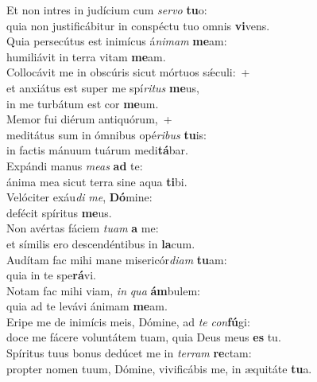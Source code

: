 \evenverse Et non intres in judícium cum \textit{ser}\textit{vo} \textbf{tu}o:~\*\\
\evenverse quia non justificábitur in conspéctu tuo omnis \textbf{vi}vens.\\
\oddverse Quia persecútus est inimícus á\textit{ni}\textit{mam} \textbf{me}am:~\*\\
\oddverse humiliávit in terra vitam \textbf{me}am.\\
\evenverse Collocávit me in obscúris sicut mórtuos sǽculi:~+\\
\evenverse  et anxiátus est super me spí\textit{ri}\textit{tus} \textbf{me}us,~\*\\
\evenverse in me turbátum est cor \textbf{me}um.\\
\oddverse Memor fui diérum antiquórum,~+\\
\oddverse  meditátus sum in ómnibus opé\textit{ri}\textit{bus} \textbf{tu}is:~\*\\
\oddverse in factis mánuum tuárum medi\textbf{tá}bar.\\
\evenverse Expándi manus \textit{me}\textit{as} \textbf{ad} te:~\*\\
\evenverse ánima mea sicut terra sine aqua \textbf{ti}bi.\\
\oddverse Velóciter exáu\textit{di} \textit{me}, \textbf{Dó}mine:~\*\\
\oddverse defécit spíritus \textbf{me}us.\\
\evenverse Non avértas fáciem \textit{tu}\textit{am} \textbf{a} me:~\*\\
\evenverse et símilis ero descendéntibus in \textbf{la}cum.\\
\oddverse Audítam fac mihi mane misericór\textit{di}\textit{am} \textbf{tu}am:~\*\\
\oddverse quia in te spe\textbf{rá}vi.\\
\evenverse Notam fac mihi viam, \textit{in} \textit{qua} \textbf{ám}bulem:~\*\\
\evenverse quia ad te levávi ánimam \textbf{me}am.\\
\oddverse Eripe me de inimícis meis, Dómine, ad \textit{te} \textit{con}\textbf{fú}gi:~\*\\
\oddverse doce me fácere voluntátem tuam, quia Deus meus \textbf{es} tu.\\
\evenverse Spíritus tuus bonus dedúcet me in \textit{ter}\textit{ram} \textbf{re}ctam:~\*\\
\evenverse propter nomen tuum, Dómine, vivificábis me, in æquitáte \textbf{tu}a.\\
